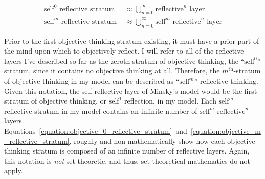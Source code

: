 \begin{align}
\label{equation:self_0_reflective_stratum}
\text{self}^0\text{ reflective stratum } &{\approx} \bigcup_{n=0}^{\infty}{\text{reflective}^n\text{ layer}} \\
\label{equation:objective_m_reflective_stratum}
\text{self}^m\text{ reflective stratum } &{\approx} \bigcup_{n=0}^{\infty}{\text{self}^m\text{ reflective}^n\text{ layer}}
\end{align}

Prior to the first objective thinking stratum existing, it must have a
prior part of the mind upon which to objectively reflect.  I will
refer to all of the reflective layers I've described so far as the
zeroth-stratum of objective thinking, the ``$\text{self}^0$''
stratum, since it contains no objective thinking at all.  Therefore,
the $m^\text{th}$-stratum of objective thinking in my model can be
described as ``$\text{self}^m$'' reflective thinking.  Given this
notation, the self-reflective layer of Minsky's model would be the
first-stratum of objective thinking, or $\text{self}^1$ reflection,
in my model.  Each $\text{self}^m$ reflective stratum in my model
contains an infinite number of $\text{self}^m\text{ reflective}^n$
layers.
Equations~\ref{equation:objective_0_reflective_stratum}~and~\ref{equation:objective_m_reflective_stratum},
roughly and non-mathematically show how each objective thinking
stratum is composed of an infinite number of reflective layers.
Again, this notation is \emph{not} set theoretic, and thus, set
theoretical mathematics do not apply.

